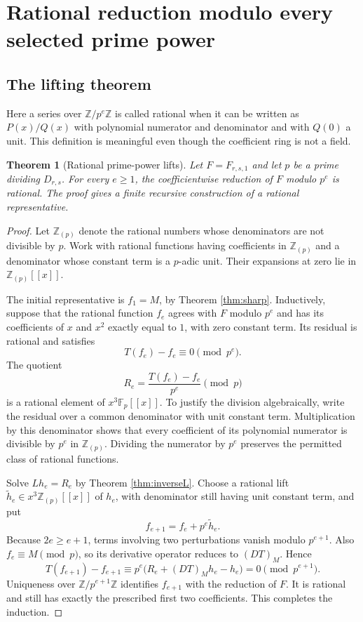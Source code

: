 \documentclass[11pt,letterpaper]{article}
\newtheorem{theorem}{Theorem}[section]
\theoremstyle{definition}
\theoremstyle{remark}
\newcommand{\Z}{\mathbb Z}
\newcommand{\F}{\mathbb F}
\begin{document}
\section{Rational reduction modulo every selected prime power}\label{sec:lifting}

\subsection{The lifting theorem}
Here a series over $\Z/p^e\Z$ is called rational when it can be written
as $P(x)/Q(x)$ with polynomial numerator and denominator and with
$Q(0)$ a unit.  This definition is meaningful even though the coefficient
ring is not a field.

\begin{theorem}[Rational prime-power lifts]\label{thm:rationallifts}
Let $F=F_{r,s,1}$ and let $p$ be a prime dividing $D_{r,s}$.
For every $e\geq1$, the coefficientwise reduction of $F$ modulo $p^e$
is rational.  The proof gives a finite recursive construction of a
rational representative.
\end{theorem}
\begin{proof}
Let $\Z_{(p)}$ denote the rational numbers whose denominators are not
divisible by $p$.  Work with rational functions having coefficients in
$\Z_{(p)}$ and a denominator whose constant term is a $p$-adic unit.
Their expansions at zero lie in $\Z_{(p)}[[x]]$.

The initial representative is $f_1=M$, by Theorem \ref{thm:sharp}.
Inductively, suppose that the rational function $f_e$ agrees with $F$
modulo $p^e$ and has its coefficients of $x$ and $x^2$ exactly equal to
$1$, with zero constant term.  Its residual is rational and satisfies
\[
 T(f_e)-f_e\equiv0\pmod {p^e}.
\]
The quotient
\begin{equation}\label{eq:Re}
 R_e=\frac{T(f_e)-f_e}{p^e}\pmod p
\end{equation}
is a rational element of $x^3\F_p[[x]]$.  To justify the division
algebraically, write the residual over a common denominator with unit
constant term.  Multiplication by this denominator shows that every
coefficient of its polynomial numerator is divisible by $p^e$ in
$\Z_{(p)}$.  Dividing the numerator by $p^e$ preserves the permitted
class of rational functions.

Solve $Lh_e=R_e$ by Theorem \ref{thm:inverseL}.  Choose a rational lift
$\widetilde h_e\in x^3\Z_{(p)}[[x]]$ of $h_e$, with denominator still
having unit constant term, and put
\begin{equation}\label{eq:liftstep}
 f_{e+1}=f_e+p^e\widetilde h_e.
\end{equation}
Because $2e\geq e+1$, terms involving two perturbations vanish modulo
$p^{e+1}$.  Also $f_e\equiv M\pmod p$, so its derivative operator reduces
to $(DT)_M$.  Hence
\[
 T(f_{e+1})-f_{e+1}
 \equiv p^e\bigl(R_e+(DT)_M h_e-h_e\bigr)
 =0\pmod {p^{e+1}}.
\]
Uniqueness over $\Z/p^{e+1}\Z$ identifies $f_{e+1}$ with the reduction
of $F$.  It is rational and still has exactly the prescribed first two
coefficients.  This completes the induction.
\end{proof}
\end{document}
